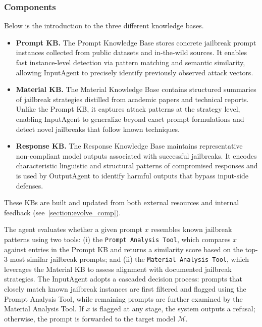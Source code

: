 \documentclass[letterpaper,twocolumn,10pt]{article}
\newcommand{\mypara}[1]{\noindent{\bf {#1}.} \xspace}
\newcommand{\inputagent}{InputAgent\xspace}
\newcommand{\outputagent}{OutputAgent\xspace}
\begin{document}
\subsubsection{Components}

\mypara{Knowledge Bases}
Below is the introduction to the three different knowledge bases.
\begin{itemize}

    \item \textbf{Prompt KB.}
    The Prompt Knowledge Base stores concrete jailbreak prompt instances collected from public datasets and in-the-wild sources.
    It enables fast instance-level detection via pattern matching and semantic similarity, allowing \inputagent to precisely identify previously observed attack vectors.

    \item \textbf{Material KB.}
    The Material Knowledge Base contains structured summaries of jailbreak strategies distilled from academic papers and technical reports.
    Unlike the Prompt KB, it captures attack patterns at the strategy level, enabling \inputagent to generalize beyond exact prompt formulations and detect novel jailbreaks that follow known techniques.

    \item \textbf{Response KB.}
    The Response Knowledge Base maintains representative non-compliant model outputs associated with successful jailbreaks.
    It encodes characteristic linguistic and structural patterns of compromised responses and is used by \outputagent to identify harmful outputs that bypass input-side defenses.

\end{itemize}
These KBs are built and updated from both external resources and internal feedback (see~\autoref{section:evolve_comp}).

\mypara{\inputagent}
The agent evaluates whether a given prompt $x$ resembles known jailbreak patterns using two tools:
(i) the \texttt{Prompt Analysis Tool}, which compares $x$ against entries in the Prompt KB and returns a similarity score based on the top-3 most similar jailbreak prompts; and
(ii) the \texttt{Material Analysis Tool}, which leverages the Material KB to assess alignment with documented jailbreak strategies.
The \inputagent adopts a cascaded decision process: prompts that closely match known jailbreak instances are first filtered and flagged using the Prompt Analysis Tool, while remaining prompts are further examined by the Material Analysis Tool.
If $x$ is flagged at any stage, the system outputs a refusal; otherwise, the prompt is forwarded to the target model $\mathcal{M}$.
\end{document}
